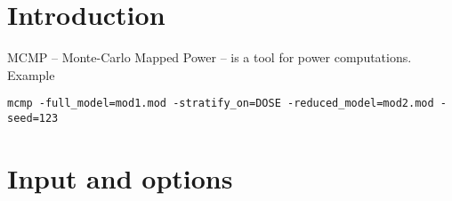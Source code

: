 




\maketitle


\section{Introduction}
MCMP – Monte-Carlo Mapped Power \cite{Vong}  – is a tool for power computations.
Example\\
\begin{verbatim}
mcmp -full_model=mod1.mod -stratify_on=DOSE -reduced_model=mod2.mod -seed=123
\end{verbatim}

\section{Input and options}

